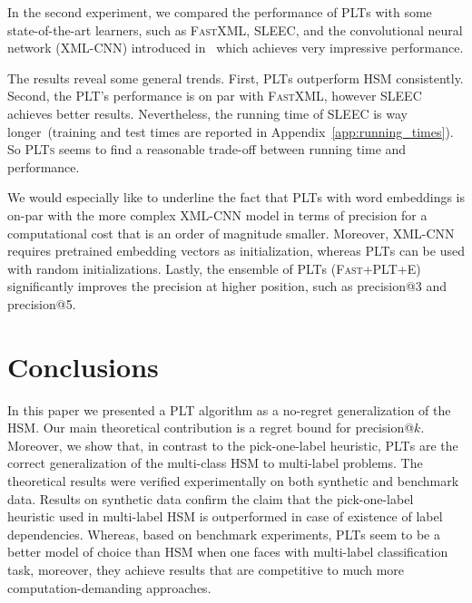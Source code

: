 \documentclass{article}
\newcommand{\Algo}[1]{\textsc{#1}}
\begin{document}
{%
In the second experiment, we compared the performance of \Algo{PLT}s with some state-of-the-art learners, such as \Algo{FastXML}, \Algo{SLEEC}, and the convolutional neural network (\Algo{XML-CNN}) introduced in~\citep{Liu_et_al_2017} which achieves very impressive performance. %

The results reveal some general trends. First, \Algo{PLT}s outperform \Algo{HSM} consistently. Second, the \Algo{PLT}'s performance is on par with \Algo{FastXML}, however SLEEC achieves better results. Nevertheless, the running time of SLEEC is way longer~(training and test times are reported in Appendix~\ref{app:running_times}). So \Algo{PLTs} seems to find a reasonable trade-off between running time and performance.

We would especially like to underline the fact that \Algo{PLT}s with word embeddings is on-par with the more complex \Algo{XML-CNN} model in terms of precision for a computational cost that is an order of magnitude smaller. Moreover, \Algo{XML-CNN} requires pretrained embedding vectors as initialization, whereas \Algo{PLT}s can be used with random initializations.
%
Lastly, the ensemble of \Algo{PLT}s (\Algo{Fast+PLT+E}) significantly improves the precision at higher position, such as precision@3 and precision@5. 

\section{Conclusions}

In this paper we presented a \Algo{PLT} algorithm as a no-regret generalization of the \Algo{HSM}. Our main theoretical contribution is a regret bound for precision@$k$. Moreover, we show that, in contrast to the pick-one-label heuristic, \Algo{PLT}s are the correct generalization of the multi-class \Algo{HSM} to multi-label problems. The theoretical results were verified experimentally on both synthetic and benchmark data. Results on synthetic data confirm the claim that the pick-one-label heuristic used in multi-label \Algo{HSM} is outperformed in case of existence of label dependencies. Whereas, based on benchmark experiments, \Algo{PLT}s seem to be a better model of choice than \Algo{HSM} when one faces with multi-label classification task, moreover, they achieve results that are competitive to much more computation-demanding approaches. 

}
\end{document}
